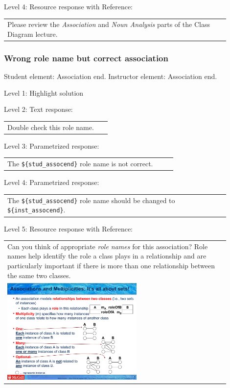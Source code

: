 \noindent Level 4: Resource response with Reference: \medskip

\begin{tabular}{|p{0.9\linewidth}}
Please review the \textit{Association} and \textit{Noun Analysis} parts of the Class Diagram lecture.
\end{tabular} \medskip


\subsubsection{Wrong role name but correct association}

Student element: Association end. Instructor element: Association end. \medskip

\noindent Level 1: Highlight solution  \medskip

\noindent Level 2: Text response: \medskip

\begin{tabular}{|p{0.9\linewidth}}
Double check this role name.
\end{tabular} \medskip

\noindent Level 3: Parametrized response: \medskip

\begin{tabular}{|p{0.9\linewidth}}
The \verb|${stud_assocend}| role name is not correct.
\end{tabular} \medskip

\noindent Level 4: Parametrized response: \medskip

\begin{tabular}{|p{0.9\linewidth}}
The \verb|${stud_assocend}| role name should be changed to \verb|${inst_assocend}|.
\end{tabular} \medskip

\noindent Level 5: Resource response with Reference: \medskip

\begin{tabular}{|p{0.9\linewidth}}
Can you think of appropriate \textit{role names}
for this association? Role names help identify the role a class plays in a
relationship and are particularly important if there is more than one relationship
between the same two classes.

\\
\includegraphics[width=0.6\textwidth]{images/role_name.png}

\end{tabular} \medskip


